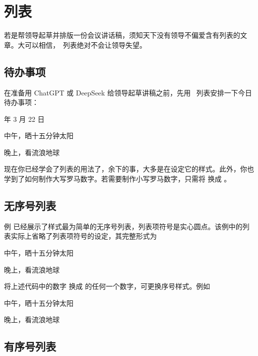 \chapter{列表}

若是帮领导起草并排版一份会议讲话稿，须知天下没有领导不偏爱含有列表的文章。大可以相信，\CONTEXT\ 列表绝对不会让领导失望。

\section{待办事项}

在准备用 ChatGPT 或 DeepSeek 给领导起草讲稿之前，先用 \CONTEXT\ 列表安排一下今日待办事项：

 年 3 月 22 日
\startitemize
\item 中午，晒十五分钟太阳
\item 晚上，看流浪地球 
\stopitemize
\stopexample
{}

现在你已经学会了列表的用法了，余下的事，大多是在设定它的样式。此外，你也学到了如何制作大写罗马数字。若需要制作小写罗马数字，只需将 \type{\Romannumerals} 换成 \type{\romannumerals}。

\section{无序号列表}

例  已经展示了样式最为简单的无序号列表，列表项符号是实心圆点。该例中的列表实际上省略了列表项符号的设定，其完整形式为

\starttyping[option=TEX]
\startitemize[1]
\item 中午，晒十五分钟太阳
\item 晚上，看流浪地球 
\stopitemize
\stoptyping

将上述代码中的数字  换成  的任何一个数字，可更换序号样式。例如

\startexample
\startitemize[8]
\item 中午，晒十五分钟太阳
\item 晚上，看流浪地球 
\stopitemize
\stopexample
{}

\section{有序号列表}

